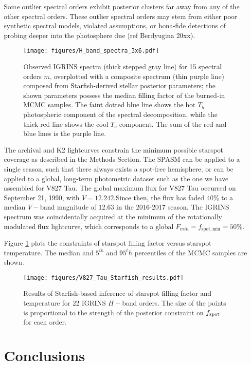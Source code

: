\documentclass[twocolumn]{emulateapj}%
\begin{document}
Some outlier spectral orders exhibit posterior clusters far away from any of the other spectral orders.  These outlier spectral orders may stem from either poor synthetic spectral models, violated assumptions, or bona-fide detections of probing deeper into the photosphere due (ref Berdyugina 20xx).

\begin{figure*}
\centering
\texttt{[image: figures/H\_band\_spectra\_3x6.pdf]}
\caption{Observed IGRINS spectra (thick stepped gray line) for 15 spectral orders $m$,  overplotted with a composite spectrum (thin purple line) composed from Starfish-derived stellar posterior parameters; the shown parameters possess the median filling factor of the burned-in MCMC samples.  The faint dotted blue line shows the hot $T_h$ photospheric component of the spectral decomposition, while the thick red line shows the cool $T_c$ component.  The sum of the red and blue lines is the purple line.  \label{fig:IGRINS-spectra}}
\end{figure*}

The archival and K2 lightcurves constrain the minimum possible starspot coverage as described in the Methods Section.  The SPASM can be applied to a single season, such that there always exists a spot-free hemisphere, or can be applied to a global, long-term photometric dataset such as the one we have assembled for V827 Tau.  The global maximum flux for V827 Tau occurred on September 21, 1990, with $V=12.242$.Since then, the flux has faded 40\% to a median $V-$band magnitude of 12.63 in the 2016-2017 season.  The IGRINS spectrum was coincidentally acquired at the minimum of the rotationally modulated flux lightcurve, which corresponds to a global $F_{min} = f_{\mathrm{spot, min}} = 50\%$.

Figure \ref{} plots the constraints of starspot filling factor versus starspot temperature.  The median and $5^{th}$ and $95^th$ percentiles of the MCMC samples are shown.

\begin{figure*}
\centering
  \texttt{[image: figures/V827\_Tau\_Starfish\_results.pdf]}
  \caption{Results of Starfish-based inference of starspot filling factor and temperature for 22 IGRINS $H-$band orders.  The size of the points is proportional to the strength of the posterior constraint on $f_{\rm spot}$ for each order.}
\label{fig:V827TauStarfish}
\end{figure*}

\section{Conclusions}
\end{document}
